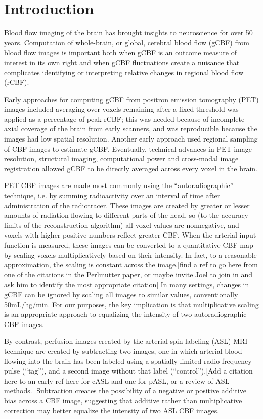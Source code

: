 \section{Introduction}
Blood flow imaging of the brain has brought insights to neuroscience for over 50 years.\cite{Taber_2005} Computation of whole-brain, or global, cerebral blood flow (gCBF) from blood flow images is important both when gCBF is an outcome measure of interest in its own right and when gCBF fluctuations create a nuisance that complicates identifying or interpreting relative changes in regional blood flow (rCBF).\cite{Small_2004} 

Early approaches for computing gCBF from positron emission tomography (PET) images included averaging over voxels remaining after a fixed threshold was applied as a percentage of peak rCBF; this was needed because of incomplete axial coverage of the brain from early scanners, and was reproducible because the images had low spatial resolution.\cite{6609680} Another early approach used regional sampling of CBF images to estimate gCBF.\cite{6971299}\cite{Perlmutter_1985} Eventually, technical advances in PET image resolution, structural imaging, computational power and cross-modal image registration allowed gCBF to be directly averaged across every voxel in the brain.

PET CBF images are made most commonly using the ``autoradiographic'' technique, i.e. by summing radioactivity over an interval of time after administration of the radiotracer. These images are created by greater or lesser amounts of radiation flowing to different parts of the head, so (to the accuracy limits of the reconstruction algorithm) all voxel values are nonnegative, and voxels with higher positive numbers reflect greater CBF. When the arterial input function is measured, these images can be converted to a quantitative CBF map by scaling voxels multiplicatively based on their intensity. In fact, to a reasonable approximation, the scaling is constant across the image.[find a ref to go here from one of the citations in the Perlmutter paper, or maybe invite Joel to join in and ask him to identify the most appropriate citation] In many settings, changes in gCBF can be ignored by scaling all images to similar values, conventionally 50mL/hg/min. For our purposes, the key implication is that multiplicative scaling is an appropriate approach to equalizing the intensity of two autoradiographic CBF images. 

By contrast, perfusion images created by the arterial spin labeling (ASL) MRI technique are created by subtracting two images, one in which arterial blood flowing into the brain has been labeled using a spatially limited radio frequency pulse (``tag''), and a second image without that label (``control'').[Add a citation here to an early ref here for cASL and one for pASL, or a review of ASL methods.] Subtraction creates the possibility of a negative or positive additive bias across a CBF image, suggesting that additive rather than multiplicative correction may better equalize the intensity of two ASL CBF images.

